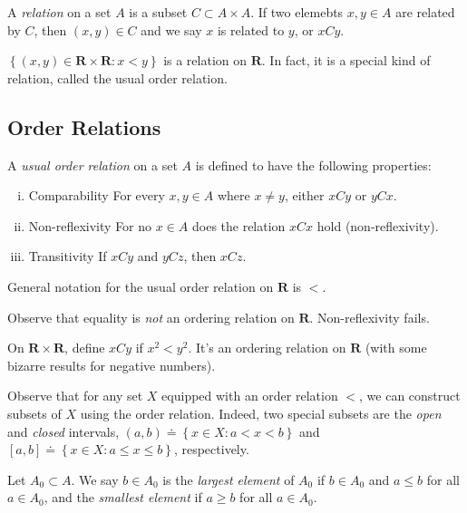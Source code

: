 \begin{definition}
	A \emph{relation} on a set $A$ is a subset $C \subset A \times A$.
	If two elemebts $x, y \in A$ are related by $C$, then $(x,y) \in C$ and
	we say $x$ is related to $y$, or $xCy$.
\end{definition}
\begin{example}
	$\left\{ (x,y) \in \mathbf{R} \times \mathbf{R}: x<y \right\}$ is a relation on $\mathbf{R}$.
	In fact, it is a special kind of relation, called the usual order relation.
\end{example}

\subsection{Order Relations}
\begin{definition}
	A \emph{usual order relation } on a set $A$ is defined to have the following
	properties:
	\begin{enumerate}[(i)]
		\item{Comparability} For every $x,y \in A$ where $x \neq y$, either $xCy$ or $yCx$.
		\item{Non-reflexivity} For no $x \in A$ does the relation $xCx$ hold (non-reflexivity).
		\item{Transitivity} If $xCy$ and $yCz$, then $xCz$.
	\end{enumerate}
	General notation for the usual order relation on $\mathbf{R}$ is $<$.
\end{definition}
\begin{remark}\label{rem:}
	Observe that equality is \emph{not} an ordering relation on $\mathbf{R}$. Non-reflexivity
	fails.
\end{remark}
\begin{example}
	On $\mathbf{R} \times \mathbf{R}$, define $xCy$ if $x^{2} < y^{2}$. It's an ordering
	relation on $\mathbf{R}$ (with some bizarre results for negative numbers).
\end{example}
Observe that for any set $X$ equipped with an order relation $<$, we can
construct subsets of $X$ using the order relation. Indeed, two special
subsets are the \emph{open} and \emph{closed} intervals,
$(a,b)\doteq \left\{ x \in X: a < x < b \right\}$ and $[a,b] \doteq \left\{ x
	\in X: a \le x \le b
\right\}$, respectively.

Let $A_{0}  \subset A$. We say $b \in A_{0}$ is the \emph{largest element} of
$A_{0}$ if $b \in A_{0}$ and $a \le b$ for all $a \in A_{0}$, and the
\emph{smallest element} if $a \ge b$ for all $a \in A_{0}$.

